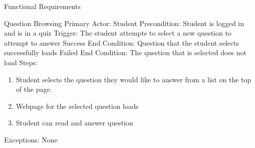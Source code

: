\documentclass{article}
\begin{document}
\begin{section}{Functional Requirements}
    \begin{subsection}{Question Browsing}
    Primary Actor: Student \newline
    Precondition: Student is logged in and is in a quiz         \newline
    Trigger: The student attempts to select a new question      to attempt to answer \newline
    Success End Condition: Question that the student selects     successfully loads \newline
    Failed End Condition: The question that is selected does     not load \newline
    \newline
    Steps:
    \begin{enumerate}
    \item{Student selects the question they would like to        answer from a list on the top of the page.}
    \item{Webpage for the selected question loads}
    \item{Student can read and answer question}
    \end{enumerate}
    Exceptions: None
    \end{subsection}

\end{section}
\end{document}

